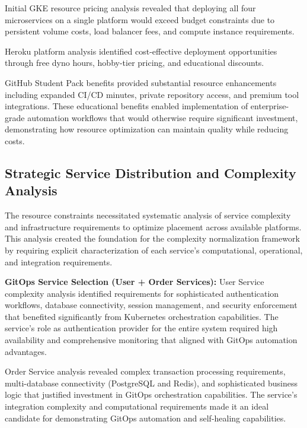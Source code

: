 Initial GKE resource pricing analysis \cite{gcp_pricing2023} revealed that deploying all four microservices on a single platform would exceed budget constraints due to persistent volume costs, load balancer fees, and compute instance requirements.


Heroku platform analysis \cite{heroku_platform2023} identified cost-effective deployment opportunities through free dyno hours, hobby-tier pricing, and educational discounts.

GitHub Student Pack benefits provided substantial resource enhancements including expanded CI/CD minutes, private repository access, and premium tool integrations. These educational benefits enabled implementation of enterprise-grade automation workflows that would otherwise require significant investment, demonstrating how resource optimization can maintain quality while reducing costs.

\subsection{Strategic Service Distribution and Complexity Analysis}

The resource constraints necessitated systematic analysis of service complexity and infrastructure requirements to optimize placement across available platforms. This analysis created the foundation for the complexity normalization framework by requiring explicit characterization of each service's computational, operational, and integration requirements.

\textbf{GitOps Service Selection (User + Order Services):}
User Service complexity analysis identified requirements for sophisticated authentication workflows, database connectivity, session management, and security enforcement that benefited significantly from Kubernetes orchestration capabilities. The service's role as authentication provider for the entire system required high availability and comprehensive monitoring that aligned with GitOps automation advantages.

Order Service analysis revealed complex transaction processing requirements, multi-database connectivity (PostgreSQL and Redis), and sophisticated business logic that justified investment in GitOps orchestration capabilities. The service's integration complexity and computational requirements made it an ideal candidate for demonstrating GitOps automation and self-healing capabilities.

